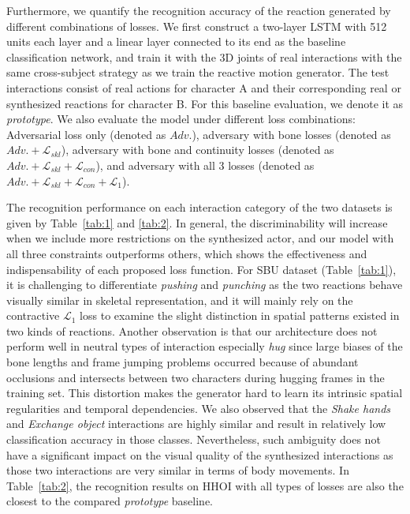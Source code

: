 \documentclass[times,twocolumn,final]{elsarticle}
\begin{document}
Furthermore, we quantify the recognition accuracy of the reaction generated by different combinations of losses. We first construct a two-layer LSTM with 512 units each layer and a linear layer connected to its end as the baseline classification network, and train it with the 3D joints of real interactions with the same cross-subject strategy as we train the reactive motion generator. The test interactions consist of real actions for character A and their corresponding real or synthesized reactions for character B. For this baseline evaluation, we denote it as \emph{prototype}. We also evaluate the model under different loss combinations: Adversarial loss only (denoted as $Adv.$), adversary with bone losses (denoted as $Adv.+\mathcal{L}_{skl}$), adversary with bone and continuity losses (denoted as $Adv.+\mathcal{L}_{skl}+\mathcal{L}_{con}$), and adversary with all 3 losses (denoted as $Adv.+\mathcal{L}_{skl}+\mathcal{L}_{con}+\mathcal{L}_{1}$).


The recognition performance on each interaction category of the two datasets is given by Table~\ref{tab:1} and \ref{tab:2}. In general, the discriminability will increase when we include more restrictions on the synthesized actor, and our model with all three constraints outperforms others, which shows the effectiveness and indispensability of each proposed loss function. For SBU dataset (Table~\ref{tab:1}), it is challenging to differentiate \emph{pushing} and \emph{punching} as the two reactions behave visually similar in skeletal representation, and it will mainly rely on the contractive $\mathcal{L}_{1}$ loss to examine the slight distinction in spatial patterns existed in two kinds of reactions. Another observation is that our architecture does not perform well in neutral types of interaction especially \emph{hug} since large biases of the bone lengths and frame jumping problems occurred because of abundant occlusions and intersects between two characters during hugging frames in the training set. This distortion makes the generator hard to learn its intrinsic spatial regularities and temporal dependencies. We also observed that the \emph{Shake hands} and \emph{Exchange object} interactions are highly similar and result in relatively low classification accuracy in those classes. Nevertheless, such ambiguity does not have a significant impact on the visual quality of the synthesized interactions as those two interactions are very similar in terms of body movements. In Table~\ref{tab:2}, the recognition results on HHOI with all types of losses are also the closest to the compared \textit{prototype} baseline. 
\end{document}
